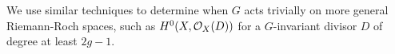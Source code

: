 We use similar techniques to determine when $G$ acts trivially on more general Riemann-Roch spaces, such as $H^0(X,{\cal O}_X(D))$ for a $G$-invariant divisor $D$ of degree at least $2g-1$.


